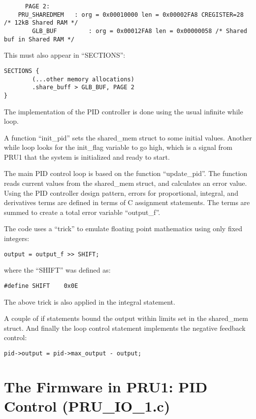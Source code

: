 \begin{verbatim}
	  PAGE 2:
	PRU_SHAREDMEM	: org = 0x00010000 len = 0x00002FA8 CREGISTER=28 /* 12kB Shared RAM */
        GLB_BUF         : org = 0x00012FA8 len = 0x00000058 /* Shared buf in Shared RAM */
\end{verbatim}

This must also appear in ``SECTIONS'':

\begin{verbatim}
SECTIONS {
        (...other memory allocations)
        .share_buff > GLB_BUF, PAGE 2
}
\end{verbatim}

The implementation of the PID controller is done using the usual infinite while loop.

A function ``init\_pid'' sets the shared\_mem struct to some initial values.  Another while loop looks for the init\_flag variable to go high, which is a signal from PRU1 that the system is initialized and ready to start.

The main PID control loop is based on the function ``update\_pid''.  The function reads current values from the shared\_mem struct, and calculates an error value.  Using the PID controller design pattern, errors for proportional, integral, and derivatives terms are defined in terms of C assignment statements.  The terms are summed to create a total error variable ``output\_f''.

The code uses a ``trick'' to emulate floating point mathematics using only fixed integers:

\begin{verbatim}
output = output_f >> SHIFT;
\end{verbatim}

where the ``SHIFT'' was defined as:

\begin{verbatim}
#define SHIFT    0x0E
\end{verbatim}

The above trick is also applied in the integral statement.

A couple of if statements bound the output within limits set in the shared\_mem struct.
And finally the loop control statement implements the negative feedback control:

\begin{verbatim}
pid->output = pid->max_output - output;
\end{verbatim}

\section{The Firmware in PRU1: PID Control (PRU\_IO\_1.c)}


